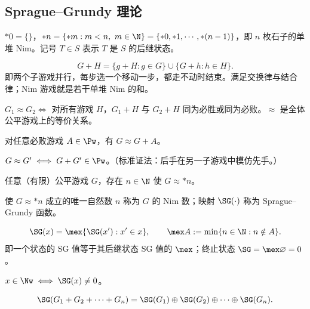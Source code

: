 \subsection{Sprague--Grundy 理论}

\begin{definition}
	$*0=\{\}$，$*n=\{*m:m<n,\ m\in\N\}=\{*0,*1,\cdots,*(n-1)\}$，即 $n$ 枚石子的单堆 Nim。记号 $T\in S$ 表示 $T$ 是 $S$ 的后继状态。
\end{definition}

\begin{definition}
	$$G+H=\{g+H:g\in G\}\cup\{G+h:h\in H\}.$$
	即两个子游戏并行，每步选一个移动一步，都走不动时结束。满足交换律与结合律；Nim 游戏就是若干单堆 Nim 的和。
\end{definition}

\begin{definition}[游戏的等价]
	$G_1\approx G_2 \iff$ 对所有游戏 $H$，$G_1+H$ 与 $G_2+H$ 同为必胜或同为必败。$\approx$ 是全体公平游戏上的等价关系。
\end{definition}

\begin{lemma}
	对任意必败游戏 $A\in\Pw$，有 $G\approx G+A$。
\end{lemma}

\begin{lemma}[等价的判别]
	$G\approx G' \iff G+G'\in\Pw$。（标准证法：后手在另一子游戏中模仿先手。）
\end{lemma}

\begin{theorem}
	任意（有限）公平游戏 $G$，存在 $n\in\N$ 使 $G\approx *n$。
\end{theorem}

\begin{definition}[Nim 数 / SG 函数]
	使 $G\approx *n$ 成立的唯一自然数 $n$ 称为 $G$ 的 Nim 数；映射 $\SG(\cdot)$ 称为 Sprague--Grundy 函数。
\end{definition}

\begin{corollary}[SG 递推]
	$$\SG(x)=\mex\{\SG(x'):x'\in x\},\qquad \mex A:=\min\{n\in\N:n\notin A\}.$$
	即一个状态的 SG 值等于其后继状态 SG 值的 $\mex$；终止状态 $\SG=\mex\varnothing=0$。
\end{corollary}

\begin{corollary}
	$x\in\Nw \iff \SG(x)\neq0$。
\end{corollary}

\begin{theorem}[游戏的和的 SG 值]
	$$\SG(G_1+G_2+\cdots+G_n)=\SG(G_1)\oplus\SG(G_2)\oplus\cdots\oplus\SG(G_n).$$
\end{theorem}

